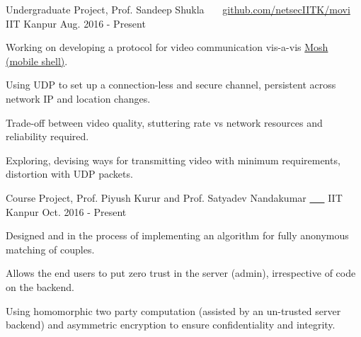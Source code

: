 


\begin{cventries}


  \cventry
  {Undergraduate Project, Prof. Sandeep Shukla}
  {\href{https://github.com/netsecIITK/moVi}{}
    \ \ \ \normalfont\href{https://github.com/netsecIITK/moVi}
    {github.com/netsecIITK/movi}}
  {IIT Kanpur}
  {Aug. 2016 - Present}
  {
    \begin{cvitems}
    \item Working on developing a protocol for video communication
      vis-a-vis \href{https://mosh.org/}{Mosh (mobile shell)}.
    \item Using UDP to set up a connection-less and secure channel,
      persistent across network IP and location changes.
    \item Trade-off between video quality, stuttering rate vs network
      resources and reliability required.
    \item Exploring, devising ways for transmitting video
      with minimum requirements, distortion with UDP packets.
    \end{cvitems}
  }

  \cventry
  {Course Project, Prof. Piyush Kurur and
    Prof. Satyadev Nandakumar}
  {\href{https://github.com/pclubiitk/puppy-love}{
      \ \ \ }}
  {IIT Kanpur}
  {Oct. 2016 - Present}
  {
    \begin{cvitems}
      \item Designed and in the process of implementing an algorithm
        for fully anonymous matching of couples.
      \item Allows the end users to put zero trust in the server
        (admin), irrespective of code on the backend.
      \item Using homomorphic two party computation (assisted by an
        un-trusted server backend) and asymmetric encryption to
        ensure confidentiality and integrity.
    \end{cvitems}
  }


\end{cventries}
